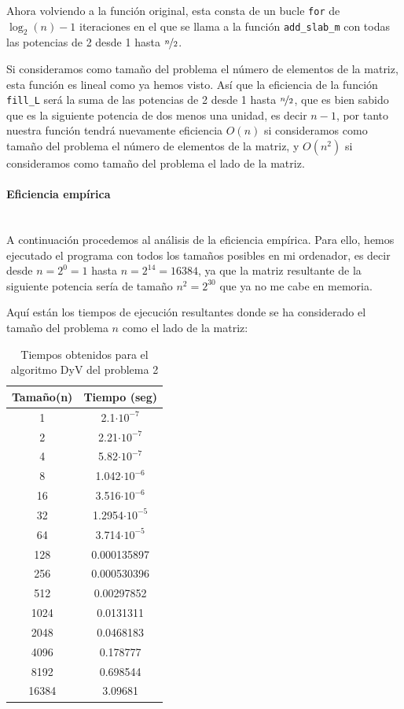 \documentclass{article}
\newcommand{\myparagraph}[1]{\paragraph{#1}\mbox{}\\}
\begin{document}
    Ahora volviendo a la función original, esta consta de un bucle
    \texttt{for} de $\log_2(n) - 1$ iteraciones en el que se llama a la función
    \texttt{add\_slab\_m} con todas las potencias de 2 desde 1 hasta $\nicefrac{n}{2}$.

    Si consideramos como tamaño del problema el número de elementos de la
    matriz, esta función es lineal como ya hemos visto. Así que la eficiencia
    de la función \texttt{fill\_L} será la suma de las potencias de 2 desde
    1 hasta $\nicefrac{n}{2}$, que es bien sabido que es la siguiente potencia de dos
    menos una unidad, es decir $n-1$, por tanto nuestra función tendrá
    nuevamente eficiencia $O(n)$ si consideramos como tamaño del problema
    el número de elementos de la matriz, y $O(n^2)$ si consideramos como
    tamaño del problema el lado de la matriz. \\

\myparagraph{Eficiencia empírica}

    A continuación procedemos al análisis de la eficiencia empírica. Para ello,
    hemos ejecutado el programa con todos los tamaños posibles en mi ordenador,
    es decir desde $n=2^0=1$ hasta $n=2^{14}=16384$, ya que la matriz resultante
    de la siguiente potencia sería de tamaño $n^2=2^{30}$ que ya no me cabe
    en memoria.

    Aquí están los tiempos de ejecución resultantes donde se ha considerado el
    tamaño del problema $n$ como el lado de la matriz:
    \begin{table}[H]
        \centering
    \begin{tabular}{|c|c|}
        \hline
        Tamaño(n) & Tiempo (seg) \\
        \hline
        1       & 2.1$\cdot 10^{-7}$ \\
        2       & 2.21$\cdot 10^{-7}$ \\
        4       & 5.82$\cdot 10^{-7}$ \\
        8       & 1.042$\cdot 10^{-6}$ \\
        16      & 3.516$\cdot 10^{-6}$ \\
        32      & 1.2954$\cdot 10^{-5}$ \\
        64      & 3.714$\cdot 10^{-5}$ \\
        128     & 0.000135897 \\
        256     & 0.000530396 \\
        512     & 0.00297852 \\
        1024    & 0.0131311 \\
        2048    & 0.0468183 \\
        4096    & 0.178777 \\
        8192    & 0.698544 \\
        16384   & 3.09681 \\
        \hline
    \end{tabular}
    \caption{\centering Tiempos obtenidos para el algoritmo DyV del problema 2}
    \end{table}
\end{document}
